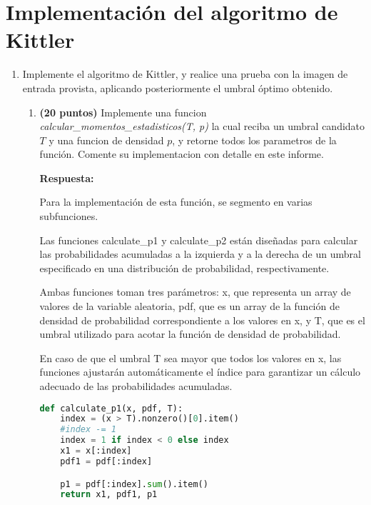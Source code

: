 \documentclass[spanish]{article}
\begin{document}
\section{Implementación del algoritmo de Kittler}
\begin{enumerate}
\item Implemente el algoritmo de Kittler, y realice una prueba con la imagen
de entrada provista, aplicando posteriormente el umbral óptimo obtenido.

\begin{enumerate}
\item \textbf{(20 puntos)} Implemente una funcion \emph{calcular\_momentos\_estadisticos(T,
p)} la cual reciba un umbral candidato $T$ y una funcion de densidad
$p$, y retorne todos los parametros de la función. Comente su implementacion
con detalle en este informe. 
\newline

\par \textbf{Respuesta:}
\par Para la implementación de esta función, se segmento en varias subfunciones.
\vspace{5px}

\par Las funciones calculate\_p1 y calculate\_p2 están diseñadas para calcular las probabilidades acumuladas a la izquierda y a la derecha de un umbral especificado en una distribución de probabilidad, respectivamente. 
\vspace{5px}

\par Ambas funciones toman tres parámetros: x, que representa un array de valores de la variable aleatoria, pdf, que es un array de la función de densidad de probabilidad correspondiente a los valores en x, y T, que es el umbral utilizado para acotar la función de densidad de probabilidad.
\vspace{5px}

En caso de que el umbral T sea mayor que todos los valores en x, las funciones ajustarán automáticamente el índice para garantizar un cálculo adecuado de las probabilidades acumuladas.
\begin{lstlisting}[language=Python, caption=Función de Probabilidades]
def calculate_p1(x, pdf, T):
    index = (x > T).nonzero()[0].item()
    #index -= 1
    index = 1 if index < 0 else index
    x1 = x[:index]
    pdf1 = pdf[:index]

    p1 = pdf[:index].sum().item()
    return x1, pdf1, p1



\end{lstlisting}
\end{enumerate}
\end{enumerate}
\end{document}
